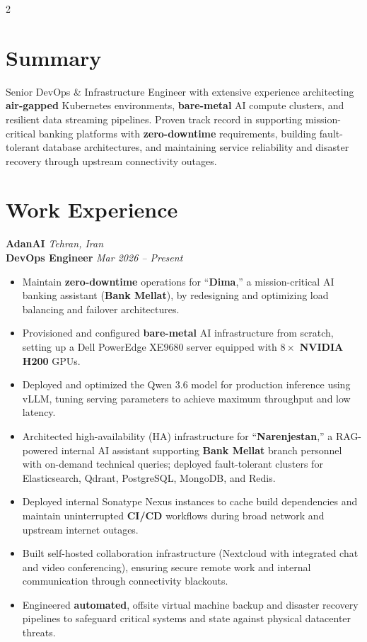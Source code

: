 \documentclass[10pt,a4paper]{article}
\begin{document}
\begin{paracol}{2}

\section{Summary}
Senior DevOps \& Infrastructure Engineer with extensive experience architecting \textbf{air-gapped} Kubernetes environments, \textbf{bare-metal} AI compute clusters, and resilient data streaming pipelines. Proven track record in supporting mission-critical banking platforms with \textbf{zero-downtime} requirements, building fault-tolerant database architectures, and maintaining service reliability and disaster recovery through upstream connectivity outages.

\vspace{4pt}

\section{Work Experience}

\textbf{AdanAI} \hfill \textit{Tehran, Iran}\\
\textbf{DevOps Engineer} \hfill \textit{Mar 2026 -- Present}
\begin{itemize}
    \item Maintain \textbf{zero-downtime} operations for ``\textbf{Dima},'' a mission-critical AI banking assistant (\textbf{Bank Mellat}), by redesigning and optimizing load balancing and failover architectures.
    \item Provisioned and configured \textbf{bare-metal} AI infrastructure from scratch, setting up a Dell PowerEdge XE9680 server equipped with $8\times$ \textbf{NVIDIA H200} GPUs.
    \item Deployed and optimized the Qwen 3.6 model for production inference using vLLM, tuning serving parameters to achieve maximum throughput and low latency.
    \item Architected high-availability (HA) infrastructure for ``\textbf{Narenjestan},'' a RAG-powered internal AI assistant supporting \textbf{Bank Mellat} branch personnel with on-demand technical queries; deployed fault-tolerant clusters for Elasticsearch, Qdrant, PostgreSQL, MongoDB, and Redis.
    \item Deployed internal Sonatype Nexus instances to cache build dependencies and maintain uninterrupted \textbf{CI/CD} workflows during broad network and upstream internet outages.
    \item Built self-hosted collaboration infrastructure (Nextcloud with integrated chat and video conferencing), ensuring secure remote work and internal communication through connectivity blackouts.
    \item Engineered \textbf{automated}, offsite virtual machine backup and disaster recovery pipelines to safeguard critical systems and state against physical datacenter threats.
\end{itemize}


\end{paracol}
\end{document}
